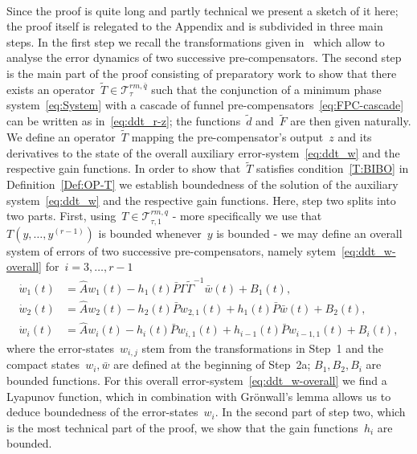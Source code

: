 \documentclass[ envcountsect, envcountsame]{svjour3}
\newcommand{\cT}{\mathcal{T}}
\begin{document}
\ \\
Since the proof is quite long and partly technical we present a sketch of it here; the proof itself is relegated to the Appendix and is subdivided in three main steps.
In the first step we recall the transformations given in~\cite[pp.~4759-4760]{BergReis18b} which allow to analyse the error dynamics of two successive pre-compensators. 
The second step is the main part of the proof consisting of preparatory work to show that there exists an operator~$\tilde T \in \cT^{rm,\bar q}_\tau$ 
such that the conjunction of a minimum phase system~\eqref{eq:System} with a cascade of funnel pre-compensators~\eqref{eq:FPC-cascade} can be written as in~\eqref{eq:ddt_r-z}; 
the functions~$\tilde d$ and~$\tilde F$ are then given naturally.
We define an operator~$\tilde T$ mapping the pre-compensator's output~$z$ and its derivatives to the state of the overall auxiliary error-system~\eqref{eq:ddt_w} and the respective gain functions. 
In order to show that~$\tilde T$ satisfies condition~\ref{T:BIBO} in Definition~\ref{Def:OP-T} we establish boundedness of the solution of the auxiliary system~\eqref{eq:ddt_w} and the respective gain functions.
Here, step two splits into two parts.
First, using~$T \in \cT^{rm,q}_{\tau,1}$ - more specifically we use that $T(y,\ldots,y^{(r-1)})$ is bounded whenever~$y$ is bounded - we may define an overall system of errors of two successive pre-compensators, namely sytem~\eqref{eq:ddt_w-overall} for~$i=3,\ldots,r-1$
\begin{equation*} %
\begin{aligned}
\dot w_1(t) &= \hat A w_1(t) - h_1(t) \bar P \Gamma \tilde \Gamma^{-1} \bar w(t) + B_1(t) , \\
\dot w_2(t) &= \hat A w_2(t) - h_2(t) \bar P w_{2,1}(t) + h_1(t) \bar P \bar w(t) + B_2(t)  , \\
\dot w_i(t) &= \hat A w_i(t) - h_i(t) \bar P w_{i,1}(t) + h_{i-1}(t) \bar P w_{i-1,1}(t) + B_i(t) ,
\end{aligned}
\end{equation*}
where the error-states~$w_{i,j}$ stem from the transformations in Step~1 and the compact states~$w_i, \bar w$ are defined at the beginning of Step~2a; $B_1, B_2, B_i$ are bounded functions. 
For this overall error-system~\eqref{eq:ddt_w-overall} we find a Lyapunov function, which in combination with Gr\"onwall's lemma allows us to deduce boundedness of the error-states~$w_i$.
In the second part of step two, which is the most technical part of the proof, we show that the gain functions~$h_i$ are bounded. 
\end{document}
